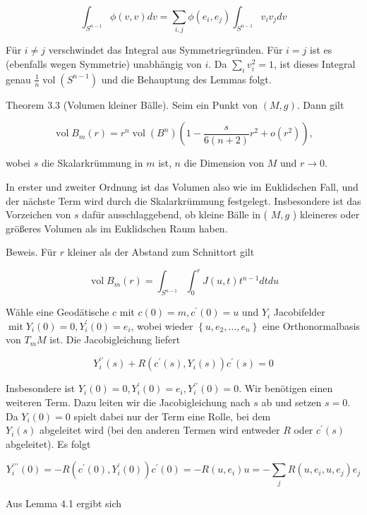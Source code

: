 \documentclass[10pt]{article}
\begin{document}
$$
\int_{S^{n-1}} \phi(v, v) d v=\sum_{i, j} \phi\left(e_{i}, e_{j}\right) \int_{S^{n-1}} v_{i} v_{j} d v
$$

Für $i \neq j$ verschwindet das Integral aus Symmetriegründen. Für $i=j$ ist es (ebenfalls wegen Symmetrie) unabhängig von $i$. Da $\sum_{i} v_{i}^{2}=1$, ist dieses Integral genau $\frac{1}{n} \operatorname{vol}\left(S^{n-1}\right)$ und die Behauptung des Lemmas folgt.

Theorem 3.3 (Volumen kleiner Bälle). Seim ein Punkt von $(M, g)$. Dann gilt

$$
\operatorname{vol} B_{m}(r)=r^{n} \operatorname{vol}\left(B^{n}\right)\left(1-\frac{s}{6(n+2)} r^{2}+o\left(r^{2}\right)\right),
$$

wobei $s$ die Skalarkrümmung in $m$ ist, $n$ die Dimension von $M$ und $r \rightarrow 0$.

In erster und zweiter Ordnung ist das Volumen also wie im Euklidschen Fall, und der nächste Term wird durch die Skalarkrümmung festgelegt. Insbesondere ist das Vorzeichen von $s$ dafür ausschlaggebend, ob kleine Bälle in ( $M, g$ ) kleineres oder größeres Volumen als im Euklidschen Raum haben.

Beweis. Für $r$ kleiner als der Abstand zum Schnittort gilt

$$
\operatorname{vol} B_{m}(r)=\int_{S^{n-1}} \int_{0}^{r} J(u, t) t^{n-1} d t d u
$$

Wähle eine Geodätische $c$ mit $c(0)=m, c^{\prime}(0)=u$ und $Y_{i}$ Jacobifelder $\operatorname{mit} Y_{i}(0)=0, Y_{i}^{\prime}(0)=e_{i}$, wobei wieder $\left\{u, e_{2}, \ldots, e_{n}\right\}$ eine Orthonormalbasis von $T_{m} M$ ist. Die Jacobigleichung liefert

$$
Y_{i}^{\prime \prime}(s)+R\left(c^{\prime}(s), Y_{i}(s)\right) c^{\prime}(s)=0
$$

Insbesondere ist $Y_{i}(0)=0, Y_{i}^{\prime}(0)=e_{i}, Y_{i}^{\prime \prime}(0)=0$. Wir benötigen einen weiteren Term. Dazu leiten wir die Jacobigleichung nach $s$ ab und setzen $s=0$. Da $Y_{i}(0)=0$ spielt dabei nur der Term eine Rolle, bei dem\\
$Y_{i}(s)$ abgeleitet wird (bei den anderen Termen wird entweder $R$ oder $c^{\prime}(s)$ abgeleitet). Es folgt

$$
Y_{i}^{\prime \prime \prime}(0)=-R\left(c^{\prime}(0), Y_{i}^{\prime}(0)\right) c^{\prime}(0)=-R\left(u, e_{i}\right) u=-\sum_{j} R\left(u, e_{i}, u, e_{j}\right) e_{j}
$$

Aus Lemma 4.1 ergibt sich
\end{document}

